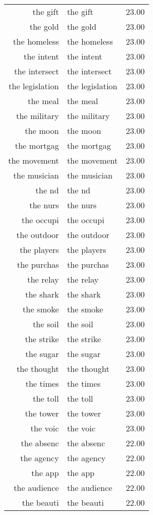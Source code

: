 \begin{table}[ht]
\begin{tabular}{rlr}
  the gift & the gift & 23.00 \\ 
  the gold & the gold & 23.00 \\ 
  the homeless & the homeless & 23.00 \\ 
  the intent & the intent & 23.00 \\ 
  the intersect & the intersect & 23.00 \\ 
  the legislation & the legislation & 23.00 \\ 
  the meal & the meal & 23.00 \\ 
  the military & the military & 23.00 \\ 
  the moon & the moon & 23.00 \\ 
  the mortgag & the mortgag & 23.00 \\ 
  the movement & the movement & 23.00 \\ 
  the musician & the musician & 23.00 \\ 
  the nd & the nd & 23.00 \\ 
  the nurs & the nurs & 23.00 \\ 
  the occupi & the occupi & 23.00 \\ 
  the outdoor & the outdoor & 23.00 \\ 
  the players & the players & 23.00 \\ 
  the purchas & the purchas & 23.00 \\ 
  the relay & the relay & 23.00 \\ 
  the shark & the shark & 23.00 \\ 
  the smoke & the smoke & 23.00 \\ 
  the soil & the soil & 23.00 \\ 
  the strike & the strike & 23.00 \\ 
  the sugar & the sugar & 23.00 \\ 
  the thought & the thought & 23.00 \\ 
  the times & the times & 23.00 \\ 
  the toll & the toll & 23.00 \\ 
  the tower & the tower & 23.00 \\ 
  the voic & the voic & 23.00 \\ 
  the absenc & the absenc & 22.00 \\ 
  the agency & the agency & 22.00 \\ 
  the app & the app & 22.00 \\ 
  the audience & the audience & 22.00 \\ 
  the beauti & the beauti & 22.00 \\ 

\end{tabular}
\end{table}

